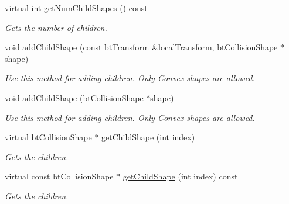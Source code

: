 \begin{DoxyCompactItemize}
virtual int \hyperlink{classbtGImpactCompoundShape_ae0673a0cf5bb33ed1e3b18b3c2565811}{get\+Num\+Child\+Shapes} () const
\begin{DoxyCompactList}\small\item\em Gets the number of children. \end{DoxyCompactList}\item 
\mbox{\label{classbtGImpactCompoundShape_a3c97aab1f6511033df73007096ed4c8a}} 
void \hyperlink{classbtGImpactCompoundShape_a3c97aab1f6511033df73007096ed4c8a}{add\+Child\+Shape} (const bt\+Transform \&local\+Transform, bt\+Collision\+Shape $\ast$shape)
\begin{DoxyCompactList}\small\item\em Use this method for adding children. Only Convex shapes are allowed. \end{DoxyCompactList}\item 
\mbox{\label{classbtGImpactCompoundShape_a106e3d9999c847a9748c962378ab3f46}} 
void \hyperlink{classbtGImpactCompoundShape_a106e3d9999c847a9748c962378ab3f46}{add\+Child\+Shape} (bt\+Collision\+Shape $\ast$shape)
\begin{DoxyCompactList}\small\item\em Use this method for adding children. Only Convex shapes are allowed. \end{DoxyCompactList}\item 
\mbox{\label{classbtGImpactCompoundShape_a91310884e33cfa7dc25d803ffb577ac0}} 
virtual bt\+Collision\+Shape $\ast$ \hyperlink{classbtGImpactCompoundShape_a91310884e33cfa7dc25d803ffb577ac0}{get\+Child\+Shape} (int index)
\begin{DoxyCompactList}\small\item\em Gets the children. \end{DoxyCompactList}\item 
\mbox{\label{classbtGImpactCompoundShape_a26b37689fa96844fabdba83be64a2cce}} 
virtual const bt\+Collision\+Shape $\ast$ \hyperlink{classbtGImpactCompoundShape_a26b37689fa96844fabdba83be64a2cce}{get\+Child\+Shape} (int index) const
\begin{DoxyCompactList}\small\item\em Gets the children. \end{DoxyCompactList}\item 

\end{DoxyCompactItemize}
